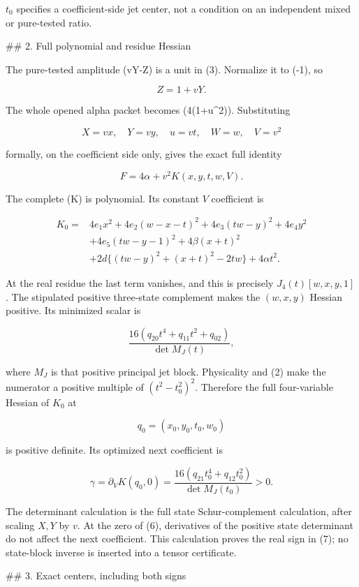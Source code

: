 \(t_0\) specifies a coefficient-side jet center, not a condition on an
independent mixed or pure-tested ratio.

## 2. Full polynomial and residue Hessian

The pure-tested amplitude (vY-Z) is a unit in (3). Normalize it to (-1),
so

\[
Z=1+vY.
\]

The whole opened alpha packet becomes (4\alpha(1+u^2)). Substituting

\[
X=vx,\quad Y=vy,\quad u=vt,\quad W=w,\quad V=v^2
\]

formally, on the coefficient side only, gives the exact full identity

\[
F=4\alpha+v^2K(x,y,t,w,V).
\tag{4}
\]

The complete (K) is polynomial. Its constant \(V\) coefficient is

\[
\begin{aligned}
K_0={}&4e_1x^2+4e_2(w-x-t)^2+4e_3(tw-y)^2+4e_4y^2\\
&+4e_5(tw-y-1)^2+4\beta(x+t)^2\\
&+2d\{(tw-y)^2+(x+t)^2-2tw\}+4\alpha t^2.
\end{aligned}
\tag{5}
\]

At the real residue the last term vanishes, and this is precisely
\(J_4(t)[w,x,y,1]\). The stipulated positive three-state complement makes
the \((w,x,y)\) Hessian positive. Its minimized scalar is

\[
\frac{16(q_{20}t^4+q_{11}t^2+q_{02})}{\det M_J(t)},
\tag{6}
\]

where \(M_J\) is that positive principal jet block. Physicality and (2)
make the numerator a positive multiple of \((t^2-t_0^2)^2\). Therefore
the full four-variable Hessian of \(K_0\) at

\[
q_0=(x_0,y_0,t_0,w_0)
\]

is positive definite. Its optimized next coefficient is

\[
\gamma=\partial_V K(q_0,0)
=\frac{16(q_{21}t_0^4+q_{12}t_0^2)}{\det M_J(t_0)}>0.
\tag{7}
\]

The determinant calculation is the full state Schur-complement calculation,
after scaling \(X,Y\) by \(v\). At the zero of (6), derivatives of the
positive state determinant do not affect the next coefficient. This
calculation proves the real sign in (7); no state-block inverse is inserted
into a tensor certificate.

## 3. Exact centers, including both signs

